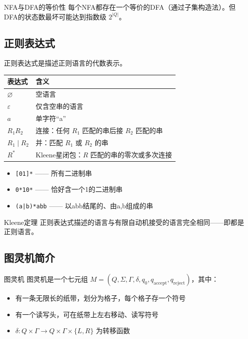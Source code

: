 \begin{myTheorem}{NFA与DFA的等价性}
每个NFA都存在一个等价的DFA（通过子集构造法）。但DFA的状态数最坏可能达到指数级 \(2^{|Q|}\)。
\end{myTheorem}

\subsection{正则表达式}

正则表达式是描述正则语言的代数表示。

\begin{table}[H]
\centering
\begin{tabular}{ll}
\toprule
表达式 & 含义 \\
\midrule
\(\varnothing\) & 空语言 \\
\(\varepsilon\) & 仅含空串的语言 \\
\(a\) & 单字符``a'' \\
\(R_1R_2\) & 连接：任何 \(R_1\) 匹配的串后接 \(R_2\) 匹配的串 \\
\(R_1\mid R_2\) & 并：匹配 \(R_1\) 或 \(R_2\) 的串 \\
\(R^*\) & Kleene星闭包：\(R\) 匹配的串的零次或多次连接 \\
\bottomrule
\end{tabular}
\end{table}

\begin{example}
\begin{itemize}
    \item \texttt{[01]*} —— 所有二进制串
    \item \texttt{0*10*} —— 恰好含一个1的二进制串
    \item \texttt{(a|b)*abb} —— 以abb结尾的、由a,b组成的串
\end{itemize}
\end{example}

\begin{myTheorem}{Kleene定理}
正则表达式描述的语言与有限自动机接受的语言完全相同——即都是正则语言。
\end{myTheorem}

\subsection{图灵机简介}

\begin{mydefinition}{图灵机}
图灵机是一个七元组 \(M=(Q,\Sigma,\Gamma,\delta,q_0,q_{\text{accept}},q_{\text{reject}})\)，其中：
\begin{itemize}
    \item 有一条无限长的纸带，划分为格子，每个格子存一个符号
    \item 有一个读写头，可在纸带上左右移动、读写符号
    \item \(\delta: Q\times\Gamma\to Q\times\Gamma\times\{L,R\}\) 为转移函数
\end{itemize}
\end{mydefinition}

